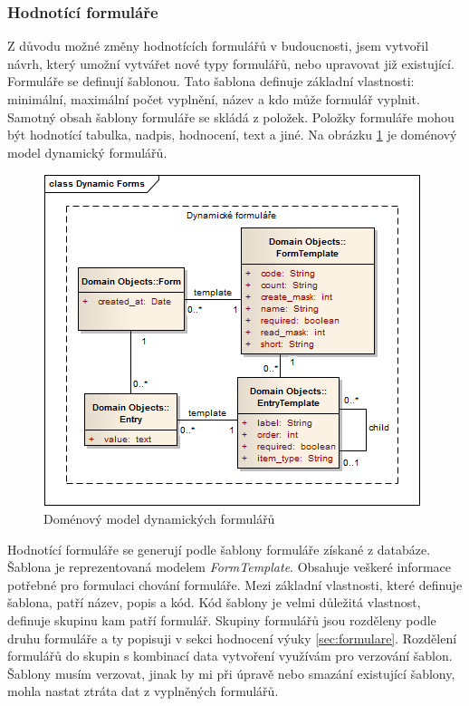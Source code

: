 \subsubsection{Hodnotící formuláře}
Z důvodu možné změny hodnotících formulářů v budoucnosti, jsem vytvořil návrh, který umožní vytvářet nové typy formulářů, nebo upravovat již existující. Formuláře se definují šablonou. Tato šablona definuje základní vlastnosti: minimální, maximální počet vyplnění, název a kdo může formulář vyplnit. Samotný obsah šablony formuláře se skládá z položek. Položky formuláře mohou být hodnotící tabulka, nadpis, hodnocení, text a jiné. Na obrázku \ref{fig:dynamicform} je doménový model dynamický formulářů.

\begin{figure}[h]
\begin{center}
\includegraphics[scale=0.6]{figures/DynamicForms}
\caption{Doménový model dynamických formulářů}
\label{fig:dynamicform}
\end{center}
\end{figure}

Hodnotící formuláře se generují podle šablony formuláře získané z databáze. Šablona je reprezentovaná modelem \textit{FormTemplate}. Obsahuje veškeré informace potřebné pro formulaci chování formuláře. Mezi základní vlastnosti, které definuje šablona, patří název, popis a kód. Kód šablony je velmi důležitá vlastnost, definuje skupinu kam patří formulář. Skupiny formulářů jsou rozděleny podle druhu formuláře a ty popisuji v sekci hodnocení výuky \ref{sec:formulare}. Rozdělení formulářů do skupin s kombinací data vytvoření využívám pro verzování šablon. Šablony musím verzovat, jinak by mi při úpravě nebo smazání existující šablony, mohla nastat ztráta dat z vyplněných formulářů.

